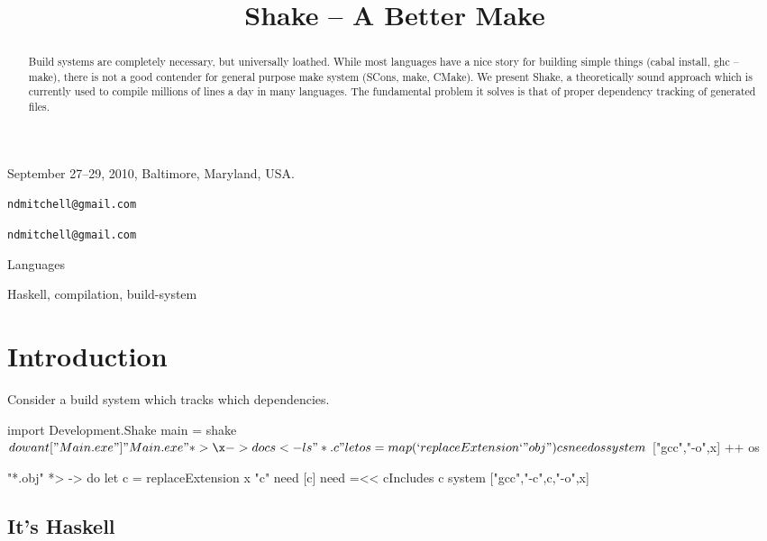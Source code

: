 \documentclass{sigplanconf}
\begin{document}
 {September 27--29, 2010, Baltimore, Maryland, USA.}

\preprintfooter{}   %

\title{Shake -- A Better Make}

           {\verb"ndmitchell@gmail.com"}

           {\verb"ndmitchell@gmail.com"}

\maketitle

\begin{abstract}
Build systems are completely necessary, but universally loathed. While most languages have a nice story for building simple things (cabal install, ghc --make), there is not a good contender for general purpose make system (SCons, make, CMake). We present Shake, a theoretically sound approach which is currently used to compile millions of lines a day in many languages. The fundamental problem it solves is that of proper dependency tracking of generated files.
\end{abstract}


\terms
Languages

\keywords
Haskell, compilation, build-system

\section{Introduction}
\label{sec:introduction}

Consider a build system which tracks which dependencies.

\begin{code}
import Development.Shake
main = shake $ do
    want ["Main.exe"]

    "Main.exe" *> \x -> do
        cs <- ls "*.c"
        let os = map (`replaceExtension` "obj") cs
        need os
        system $ ["gcc","-o",x] ++ os

    "*.obj" *> \x -> do
        let c = replaceExtension x "c"
        need [c]
        need =<< cIncludes c
        system ["gcc","-c",c,"-o",x]
\end{code}

\subsection{It's Haskell}
\end{document}
